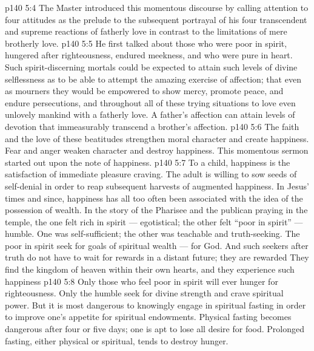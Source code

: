 \vs p140 5:4 \pc The Master introduced this momentous discourse by calling attention to four  attitudes as the prelude to the subsequent portrayal of his four transcendent and supreme reactions of fatherly love in contrast to the limitations of mere brotherly love.
\vs p140 5:5 He first talked about those who were poor in spirit, hungered after righteousness, endured meekness, and who were pure in heart. Such spirit\hyp{}discerning mortals could be expected to attain such levels of divine selflessness as to be able to attempt the amazing exercise of  affection; that even as mourners they would be empowered to show mercy, promote peace, and endure persecutions, and throughout all of these trying situations to love even unlovely mankind with a fatherly love. A father’s affection can attain levels of devotion that immeasurably transcend a brother’s affection.
\vs p140 5:6 The faith and the love of these beatitudes strengthen moral character and create happiness. Fear and anger weaken character and destroy happiness. This momentous sermon started out upon the note of happiness.
\vs p140 5:7 \bibnobreakspace {} To a child, happiness is the satisfaction of immediate pleasure craving. The adult is willing to sow seeds of self\hyp{}denial in order to reap subsequent harvests of augmented happiness. In Jesus’ times and since, happiness has all too often been associated with the idea of the possession of wealth. In the story of the Pharisee and the publican praying in the temple, the one felt rich in spirit --- egotistical; the other felt “poor in spirit” --- humble. One was self\hyp{}sufficient; the other was teachable and truth\hyp{}seeking. The poor in spirit seek for goals of spiritual wealth --- for God. And such seekers after truth do not have to wait for rewards in a distant future; they are rewarded  They find the kingdom of heaven within their own hearts, and they experience such happiness 
\vs p140 5:8 \bibnobreakspace {} Only those who feel poor in spirit will ever hunger for righteousness. Only the humble seek for divine strength and crave spiritual power. But it is most dangerous to knowingly engage in spiritual fasting in order to improve one’s appetite for spiritual endowments. Physical fasting becomes dangerous after four or five days; one is apt to lose all desire for food. Prolonged fasting, either physical or spiritual, tends to destroy hunger.
